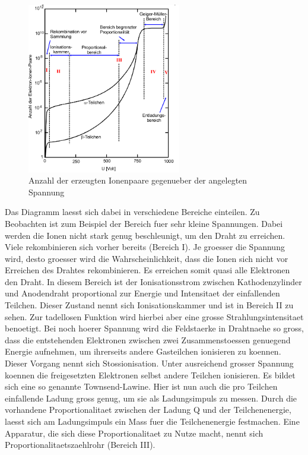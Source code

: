 \documentclass[titlepage=firstcover, captions=tableheading]{scrartcl}
\begin{document}
 \begin{figure}[H]
    \centering
    \includegraphics[width=0.6\textwidth]{"Spannung_Geiger.png"}
    \caption{Anzahl der erzeugten Ionenpaare gegenueber der angelegten Spannung}
    \label{Fig:Spannung}
\end{figure}
\noindent Das Diagramm laesst sich dabei in verschiedene Bereiche einteilen. Zu Beobachten ist zum Beispiel der Bereich fuer sehr kleine Spannungen. Dabei werden die Ionen nicht stark genug beschleunigt, um den Draht zu erreichen. Viele rekombinieren sich vorher bereits (Bereich I). Je groesser die Spannung wird, desto groesser wird die Wahrscheinlichkeit, dass die Ionen sich nicht vor Erreichen des Drahtes rekombinieren. Es erreichen somit quasi alle Elektronen den Draht. In diesem Bereich ist der Ionisationsstrom zwischen Kathodenzylinder und Anodendraht proportional zur Energie und Intensitaet der einfallenden Teilchen. Dieser Zustand nennt sich Ionisationskammer und ist in Bereich II zu sehen. Zur tadellosen Funktion wird hierbei aber eine grosse Strahlungsintensitaet benoetigt. Bei noch hoerer Spannung wird die Feldstaerke in Drahtnaehe so gross, dass die entstehenden Elektronen zwischen zwei Zusammenstoessen genuegend Energie aufnehmen, um ihrerseits andere Gasteilchen ionisieren zu koennen. Dieser Vorgang nennt sich Stossionisation. Unter ausreichend grosser Spannung koennen die freigesetzten Elektronen selbst andere Teilchen ionisieren. Es bildet sich eine so genannte Townsend-Lawine. Hier ist nun auch die pro Teilchen einfallende Ladung gross genug, um sie als Ladungsimpuls zu messen. Durch die vorhandene Proportionalitaet zwischen der Ladung Q und der Teilchenenergie, laesst sich am Ladungsimpuls ein Mass fuer die Teilchenenergie festmachen. Eine Apparatur, die sich diese Proportionalitaet zu Nutze macht, nennt sich Proportionalitaetszaehlrohr (Bereich III).
\end{document}
